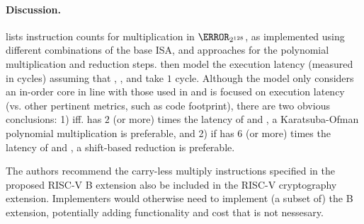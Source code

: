 
\paragraph{Discussion.}

lists instruction counts for 
multiplication in $\F_{2^{128}}$,
as implemented using different combinations of the base ISA, and approaches
for the polynomial multiplication and reduction steps.
then model the execution latency 
(measured in cycles)
assuming that , , and  take $1$ cycle.
Although the model only considers an in-order core in line with those used
in  and is focused on execution latency
(vs. other pertinent metrics, such as code footprint),
there are two obvious conclusions:
1) iff.
   has $2$ (or more) times the latency of
    and ,
   a 
   Karatsuba-Ofman 
   polynomial multiplication
   is preferable,
   and
2) if
   has $6$ (or more) times the latency of
    and ,
   a shift-based 
   reduction 
   is preferable.

The authors recommend the carry-less multiply instructions
specified in the proposed RISC-V B extension also be included in the
RISC-V cryptography extension.
Implementers would otherwise need to implement (a subset of) the B
extension, potentially adding functionality and cost that is not
nessesary.

